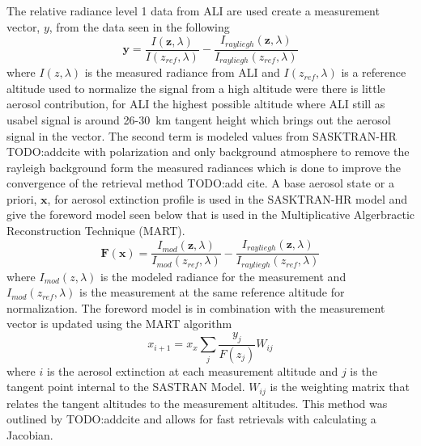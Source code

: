 \documentclass[12pt]{article}
\begin{document}
The relative radiance level 1 data from ALI are used create a measurement vector, $y$, from the data seen in the following
\begin{equation}
    \mathbf{y} = \frac{I(\mathbf{z},\lambda)}{I(z_{ref},\lambda)}-\frac{I_{rayliegh}(\mathbf{z},\lambda)}{I_{rayliegh}(z_{ref},\lambda)}
    \label{eqn:measurementVector}
\end{equation}
where $I(z,\lambda)$ is the measured radiance from ALI and $I(z_{ref},\lambda)$ is a reference altitude used to normalize the signal from a high altitude were there is little aerosol contribution, for ALI the highest possible altitude where ALI still as usabel signal is around 26-30~km tangent height which brings out the aerosol signal in the vector. The second term is modeled values from SASKTRAN-HR TODO:addcite with polarization and only background atmosphere to remove the rayleigh background form the measured radiances which is done to improve the convergence of the retrieval method TODO:add cite. A base aerosol state or a priori, $\mathbf{x}$, for aerosol extinction profile is used in the SASKTRAN-HR model and give the foreword model seen below that is used in the Multiplicative Algerbractic Reconstruction Technique (MART).
\begin{equation}
    \mathbf{F}(\mathbf{x}) = \frac{I_{mod}(
    \mathbf{z},\lambda)}{I_{mod}(z_{ref},\lambda)}-\frac{I_{rayliegh}(\mathbf{z},\lambda)}{I_{rayliegh}(z_{ref},\lambda)}
    \label{eqn:forewordModel}
\end{equation}
where $I_{mod}(z,\lambda)$ is the modeled radiance for the measurement and $I_{mod}(z_{ref},\lambda)$ is the measurement at the same reference altitude for normalization. The foreword model is in combination with the measurement vector is updated using the MART algorithm
\begin{equation}
    x_{i+1} = x_{x}\sum_{j}\frac{y_{j}}{F(z_{j})}W_{ij}
\end{equation}
where $i$ is the aerosol extinction at each measurement altitude and $j$ is the tangent point internal to the SASTRAN Model. $W_{ij}$ is the weighting matrix that relates the tangent altitudes to the measurement altitudes. This method was outlined by TODO:addcite and allows for fast retrievals with calculating a Jacobian.  
\end{document}
